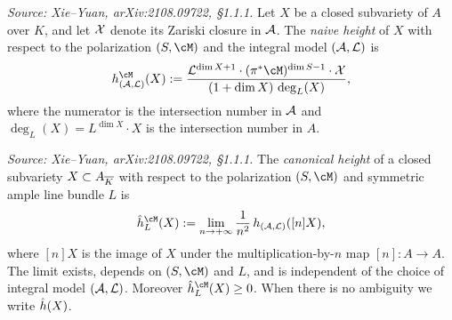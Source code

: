 \begin{definition}
  \label{def:NaiveHeight}
  \textit{Source: Xie--Yuan, arXiv:2108.09722, \S1.1.1.}
  Let \(X\) be a closed subvariety of \(A\) over \(K\), and let \(\mathcal{X}\) denote its
  Zariski closure in \(\mathcal{A}\).
  The \emph{naive height} of \(X\) with respect to the polarization \((S,\cM)\) and
  the integral model \((\mathcal{A},\mathcal{L})\) is
  \[
    h_{(\cA,\cL)}^{\cM}(X)
    := \frac{\cL^{\dim X+1} \cdot (\pi^*\cM)^{\dim S-1} \cdot \cX}
           {(1+\dim X)\,\deg_L(X)},
  \]
  where the numerator is the intersection number in \(\mathcal{A}\) and
  \(\deg_L(X) = L^{\dim X} \cdot X\) is the intersection number in \(A\).
\end{definition}

\begin{definition}
  \label{def:CanonicalHeight}
  \textit{Source: Xie--Yuan, arXiv:2108.09722, \S1.1.1.}
  The \emph{canonical height} of a closed subvariety \(X \subset A_{\overline{K}}\) with respect to
  the polarization \((S,\cM)\) and symmetric ample line bundle \(L\) is
  \[
    \hath_L^{\cM}(X)
    := \lim_{n \to +\infty} \frac{1}{n^2}\,h_{(\cA,\cL)}([n]X),
  \]
  where \([n]X\) is the image of \(X\) under the multiplication-by-\(n\) map \([n]\colon A\to A\).
  The limit exists, depends on \((S,\cM)\) and \(L\), and is independent of the choice of
  integral model \((\mathcal{A},\mathcal{L})\).  Moreover \(\hath_L^{\cM}(X) \geq 0\).
  When there is no ambiguity we write \(\hat{h}(X)\).
\end{definition}

